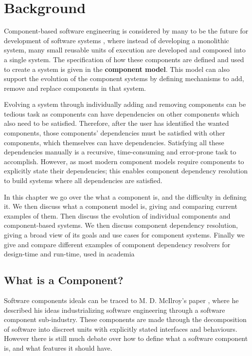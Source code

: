 \chapter{Background}
\label{background}
{}Component-based software engineering is considered by many to be the future for development of software systems \cite{Szyperski2002},
{}where instead of developing a monolithic system, 
{}many small reusable units of execution are developed and composed into a single system.
{}The specification of how these components are defined and used to create a system is given in the \textbf{component model}.
{}This model can also support the evolution of the component systems by defining mechanisms to add, remove and replace components in that system.

Evolving a system through individually adding and removing components can be tedious task 
as components can have dependencies on other components which also need to be satisfied.
Therefore, after the user has identified the wanted components, 
those components' dependencies must be satisfied with other components, which themselves can have dependencies.
Satisfying all these dependencies manually is a recursive, time-consuming and error-prone task to accomplish.
However, as most modern component models require components to explicitly state their dependencies; 
this enables component dependency resolution to build systems where all dependencies are satisfied.


In this chapter we go over the what a component is, and the difficulty in defining it.
We then discuss what a component model is, giving and comparing current examples of them.
Then discuss the evolution of individual components and component-based systems.
We then discuss component dependency resolution, giving a broad view of its goals and use cases for component systems.
Finally we give and compare different examples of component dependency resolvers for design-time and run-time, used in academia 
 
 
\section{What is a Component?}
Software components ideals can be traced to M. D. McIlroy's paper \cite{McIlroy1969}, where he described his ideas industrializing software engineering through a software component sub-industry. 
These components are made through the decomposition of software into discreet units with explicitly stated interfaces and behaviours.
However there is still much debate over how to define what a software component is, and what features it should have.\\

